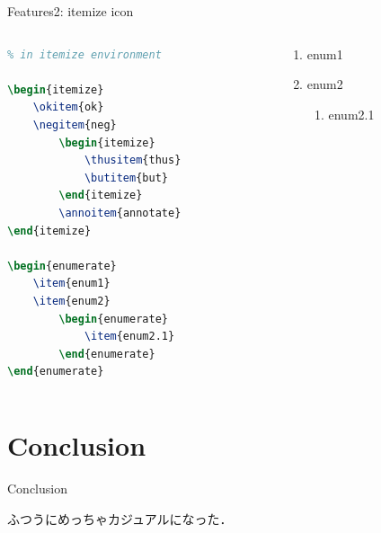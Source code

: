\documentclass[aspectratio=1610,14pt]{beamer}
\begin{document}
\begin{frame}[fragile]{Features2: itemize icon}
    \begin{columns}
        \begin{column}{0.5\textwidth}
            \begin{lstlisting}[language=TeX]
% using feature command 
% in itemize environment

\begin{itemize}
    \okitem{ok}
    \negitem{neg}
        \begin{itemize}
            \thusitem{thus}
            \butitem{but}
        \end{itemize}
        \annoitem{annotate}
\end{itemize}

\begin{enumerate}
    \item{enum1}
    \item{enum2}
        \begin{enumerate}
            \item{enum2.1}
        \end{enumerate}
\end{enumerate}            
            \end{lstlisting}
        \end{column}
        \begin{column}{0.5\textwidth}
            \begin{itemize}
                    \begin{itemize}
                    \end{itemize}
            \end{itemize}

            \begin{enumerate}
                \item{enum1}
                \item{enum2}
                    \begin{enumerate}
                        \item{enum2.1}
                    \end{enumerate}
            \end{enumerate}
        \end{column}
    \end{columns}
\end{frame}

\section{Conclusion}

\begin{frame}
    \tableofcontents[currentsection]
\end{frame}

\begin{frame}{Conclusion}
    \begin{textblock}{ふつうにめっちゃカジュアルになった．}
        \begin{itemize}
        \end{itemize}
    \end{textblock}
\end{frame}
%
%
%
%
\end{document}
